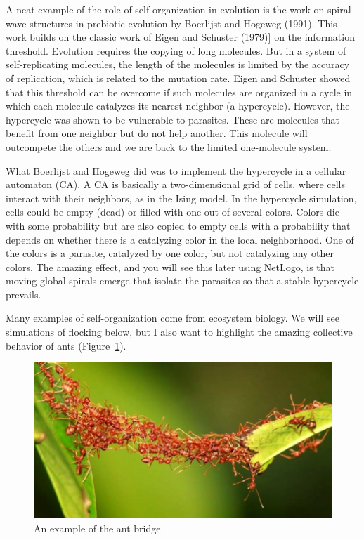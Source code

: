 \documentclass[
  a4paper,
  DIV=11,
  numbers=noendperiod,
  oneside]{scrreprt}
\begin{document}
A neat example of the role of self-organization in evolution is the work
on spiral wave structures in prebiotic evolution by Boerlijst and
Hogeweg (1991). This work builds on the classic work of Eigen and
Schuster (1979){]} on the information threshold. Evolution requires the
copying of long molecules. But in a system of self-replicating
molecules, the length of the molecules is limited by the accuracy of
replication, which is related to the mutation rate. Eigen and Schuster
showed that this threshold can be overcome if such molecules are
organized in a cycle in which each molecule catalyzes its nearest
neighbor (a hypercycle). However, the hypercycle was shown to be
vulnerable to parasites. These are molecules that benefit from one
neighbor but do not help another. This molecule will outcompete the
others and we are back to the limited one-molecule system.

What Boerlijst and Hogeweg did was to implement the hypercycle in a
cellular automaton (CA). A CA is basically a two-dimensional grid of
cells, where cells interact with their neighbors, as in the Ising model.
In the hypercycle simulation, cells could be empty (dead) or filled with
one out of several colors. Colors die with some probability but are also
copied to empty cells with a probability that depends on whether there
is a catalyzing color in the local neighborhood. One of the colors is a
parasite, catalyzed by one color, but not catalyzing any other colors.
The amazing effect, and you will see this later using NetLogo, is that
moving global spirals emerge that isolate the parasites so that a stable
hypercycle prevails.

Many examples of self-organization come from ecosystem biology. We will
see simulations of flocking below, but I also want to highlight the
amazing collective behavior of ants (Figure~\ref{fig-ch5n-img2-old-40}).

\begin{figure}

{\centering \includegraphics{media/ch5n/image2b.jpeg}

}

\caption{\label{fig-ch5n-img2-old-40}An example of the ant bridge.}

\end{figure}
\end{document}

